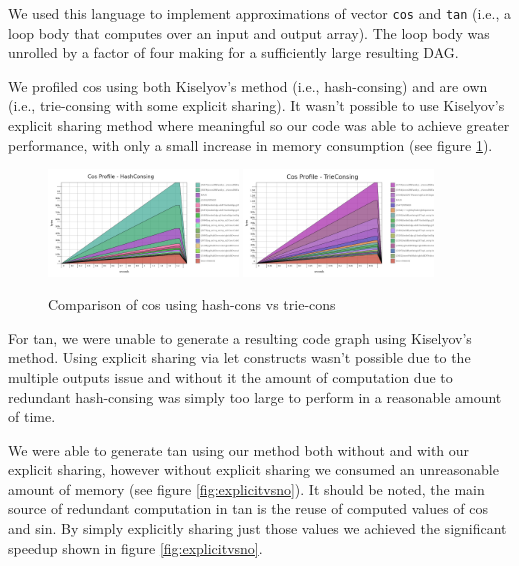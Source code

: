 \documentclass[runningheads]{llncs}
\begin{document}
We used this language to implement approximations of vector \texttt{cos} and \texttt{tan} (i.e., a
loop body that computes over an input and output array). The loop body was
unrolled by a factor of four making for a sufficiently large resulting DAG.

We profiled cos using both Kiselyov's method (i.e., hash-consing) and are own
(i.e., trie-consing with some explicit sharing). It wasn't possible to use
Kiselyov's explicit sharing method where meaningful so our code was able to
achieve greater performance, with only a small increase in memory consumption
(see figure \ref{fig:hashvscons}).

\begin{figure}[!h]
  \centering
  \includegraphics[width=0.45\textwidth]{figs/cos_profile_hashcons.png}
  \hfill
  \includegraphics[width=0.45\textwidth]{figs/cos_profile_triecons.png}
  \caption{Comparison of cos using hash-cons vs trie-cons}
  \label{fig:hashvscons}
\end{figure}


For tan, we were unable to generate a resulting code graph using Kiselyov's
method. Using explicit sharing via let constructs wasn't possible due to the
multiple outputs issue and without it the amount of computation due to redundant
hash-consing was simply too large to perform in a reasonable amount of time.

We were able to generate tan using our method both without and with our explicit
sharing, however without explicit sharing we consumed an unreasonable amount of
memory (see figure \ref{fig:explicitvsno}). It should be noted, the main source
of redundant computation in tan is the reuse of computed values of cos and sin.
By simply explicitly sharing just those values we achieved the significant
speedup shown in figure \ref{fig:explicitvsno}.
\end{document}
